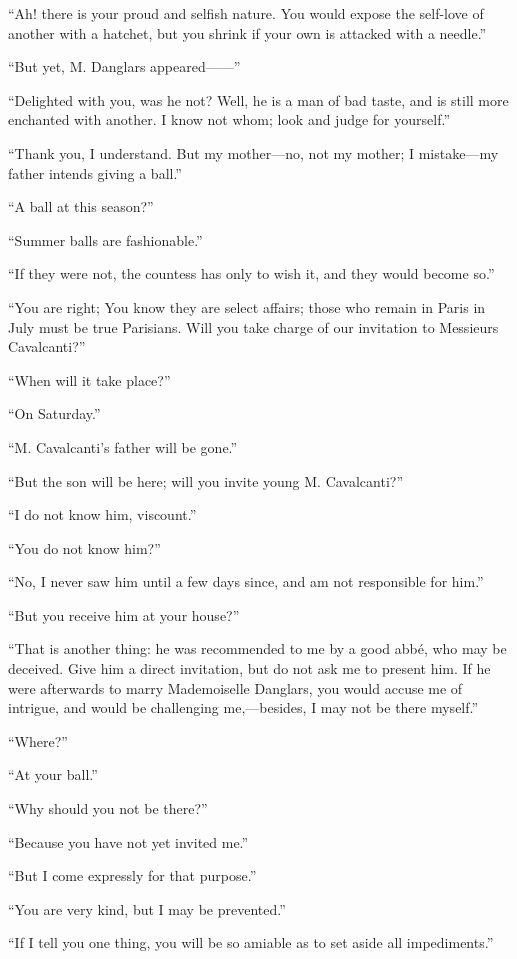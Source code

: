 “Ah! there is your proud and selfish nature. You would expose the
self-love of another with a hatchet, but you shrink if your own is
attacked with a needle.”

“But yet, M. Danglars appeared——”

“Delighted with you, was he not? Well, he is a man of bad taste, and is
still more enchanted with another. I know not whom; look and judge for
yourself.”

“Thank you, I understand. But my mother—no, not my mother; I mistake—my
father intends giving a ball.”

“A ball at this season?”

“Summer balls are fashionable.”

“If they were not, the countess has only to wish it, and they would
become so.”

“You are right; You know they are select affairs; those who remain in
Paris in July must be true Parisians. Will you take charge of our
invitation to Messieurs Cavalcanti?”

“When will it take place?”

“On Saturday.”

“M. Cavalcanti’s father will be gone.”

“But the son will be here; will you invite young M. Cavalcanti?”

“I do not know him, viscount.”

“You do not know him?”

“No, I never saw him until a few days since, and am not responsible for
him.”

“But you receive him at your house?”

“That is another thing: he was recommended to me by a good abbé, who
may be deceived. Give him a direct invitation, but do not ask me to
present him. If he were afterwards to marry Mademoiselle Danglars, you
would accuse me of intrigue, and would be challenging me,—besides, I
may not be there myself.”

“Where?”

“At your ball.”

“Why should you not be there?”

“Because you have not yet invited me.”

“But I come expressly for that purpose.”

“You are very kind, but I may be prevented.”

“If I tell you one thing, you will be so amiable as to set aside all
impediments.”

